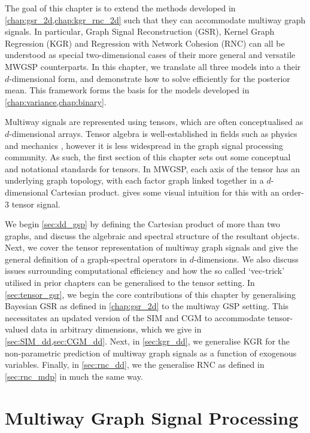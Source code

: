 The goal of this chapter is to extend the methods developed in \cref{chap:gsr_2d,chap:kgr_rnc_2d} such that they can accommodate multiway graph signals. In particular, Graph Signal Reconstruction (GSR), Kernel Graph Regression (KGR) and Regression with Network Cohesion (RNC) can all be understood as special two-dimensional cases of their more general and versatile MWGSP counterparts. In this chapter, we translate all three models into a their $d$-dimensional form, and demonstrate how to solve efficiently for the posterior mean. This framework forms the basis for the models developed in \cref{chap:variance,chap:binary}. 


Multiway signals are represented using tensors, which are often conceptualised as $d$-dimensional arrays. Tensor algebra is well-established in fields such as physics and mechanics \citep{Renteln2013}, however it is less widespread in the graph signal processing community. As such, the first section of this chapter sets out some conceptual and notational standards for tensors. In MWGSP, each axis of the tensor has an underlying graph topology, with each factor graph linked together in a $d$-dimensional Cartesian product.  gives some visual intuition for this with an order-3 tensor signal.  


We begin \cref{sec:dd_gsp} by defining the Cartesian product of more than two graphs, and discuss the algebraic and spectral structure of the resultant objects. Next, we cover the tensor representation of multiway graph signals and give the general definition of a graph-spectral operators in $d$-dimensions. We also discuss issues surrounding computational efficiency and how the so called `vec-trick' utilised in prior chapters can be generalised to the tensor setting. In \cref{sec:tensor_gsr}, we begin the core contributions of this chapter by generalising Bayesian GSR as defined in \cref{chap:gsr_2d} to the multiway GSP setting. This necessitates an updated version of the SIM and CGM to accommodate tensor-valued data in arbitrary dimensions, which we give in \cref{sec:SIM_dd,sec:CGM_dd}. Next, in \cref{sec:kgr_dd}, we generalise KGR for the non-parametric prediction of multiway graph signals as a function of exogenous variables. Finally, in \cref{sec:rnc_dd}, we the generalise RNC as defined in \cref{sec:rnc_mdp} in much the same way.  



\section{Multiway Graph Signal Processing}

